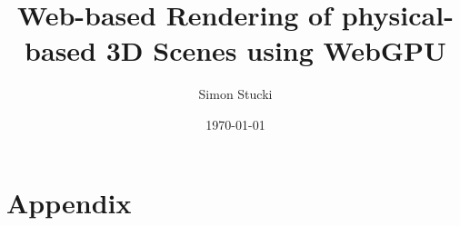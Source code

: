 \documentclass[a4paper, 11pt,abstract=on, listof=totocnumbered]{scrreprt}
\title{Web-based Rendering of physical-based 3D Scenes using WebGPU}
\author{Simon Stucki}
\date{\today}
\begin{document}
% 

\clearpage
\setcounter{page}{1}

%
%

%

%

\renewcommand{\contentsname}{Contents}
\tableofcontents

%

%

%

%

%

%

\appendix
\chapter{Appendix}
\label{ch:appendix}
%
\end{document}
